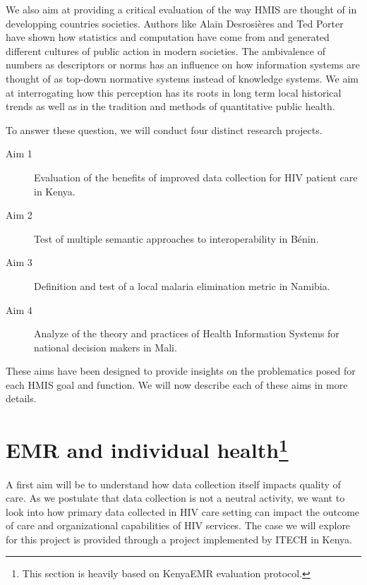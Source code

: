 \documentclass[a4paper,11pt,draft,twoside]{article}
\begin{document}
We also aim at providing a critical evaluation of the way HMIS are thought of in developping countries societies. Authors like Alain Desrosières and Ted Porter have shown how statistics and computation have come from and generated different cultures of public action in modern societies. The ambivalence of numbers as descriptors or norms has an influence on how information systems are thought of as top-down normative systems instead of knowledge systems. We aim at interrogating how this perception has its roots in long term local historical trends as well as in the tradition and methods of quantitative public health.

To answer these question, we will conduct four distinct research projects.
\begin{description}
    \item[Aim 1] Evaluation of the benefits of improved data collection for HIV patient care in Kenya.
    \item[Aim 2] Test of multiple semantic approaches to interoperability in Bénin.
    \item[Aim 3] Definition and test of a local malaria elimination metric in Namibia.
    \item[Aim 4] Analyze of the theory and practices of Health Information Systems for national decision makers in Mali.
\end{description}

These aims have been designed to provide insights on the problematics posed for each HMIS goal and function. We will now describe each of these aims in more details.

\newpage
\section[EMR and individual health]{EMR and individual health\footnote{This section is heavily based on KenyaEMR evaluation protocol.}}

A first aim will be to understand how data collection itself impacts quality of care. As we postulate that data collection is not a neutral activity, we want to look into how primary data collected in HIV care setting can impact the outcome of care and organizational capabilities of HIV services. The case we will explore for this project is provided through a project implemented by ITECH in Kenya.
\end{document}

